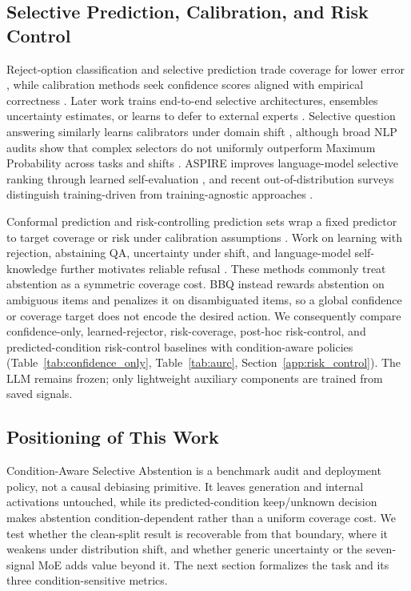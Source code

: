 \documentclass{ieeeaccess}
\newcommand{\method}{Condition-Aware Selective Abstention}
\begin{document}
\subsection{Selective Prediction, Calibration, and Risk Control}
Reject-option classification and selective prediction trade coverage for lower error \cite{chow1970optimum,geifman2017selective}, while calibration methods seek confidence scores aligned with empirical correctness \cite{guo2017calibration,desai2020calibration,jiang2021calibration}. Later work trains end-to-end selective architectures, ensembles uncertainty estimates, or learns to defer to external experts \cite{geifman2019selectivenet,lakshminarayanan2017deepensembles,mozannar2020defer}. Selective question answering similarly learns calibrators under domain shift \cite{kamath2020selective}, although broad NLP audits show that complex selectors do not uniformly outperform Maximum Probability across tasks and shifts \cite{varshney2022selective}. ASPIRE improves language-model selective ranking through learned self-evaluation \cite{chen2023aspire}, and recent out-of-distribution surveys distinguish training-driven from training-agnostic approaches \cite{lu2025ood}.

Conformal prediction and risk-controlling prediction sets wrap a fixed predictor to target coverage or risk under calibration assumptions \cite{angelopoulos2021conformal,bates2021riskcontrol,angelopoulos2024conformalrisk}. Work on learning with rejection, abstaining QA, uncertainty under shift, and language-model self-knowledge further motivates reliable refusal \cite{cortes2016rejection,xin2021abstaining,ovadia2019trust,kadavath2022know}. These methods commonly treat abstention as a symmetric coverage cost. BBQ instead rewards abstention on ambiguous items and penalizes it on disambiguated items, so a global confidence or coverage target does not encode the desired action. We consequently compare confidence-only, learned-rejector, risk-coverage, post-hoc risk-control, and predicted-condition risk-control baselines with condition-aware policies (Table~\ref{tab:confidence_only}, Table~\ref{tab:aurc}, Section~\ref{app:risk_control}). The LLM remains frozen; only lightweight auxiliary components are trained from saved signals.

\subsection{Positioning of This Work}
\method{} is a benchmark audit and deployment policy, not a causal debiasing primitive. It leaves generation and internal activations untouched, while its predicted-condition keep/unknown decision makes abstention condition-dependent rather than a uniform coverage cost. We test whether the clean-split result is recoverable from that boundary, where it weakens under distribution shift, and whether generic uncertainty or the seven-signal MoE adds value beyond it. The next section formalizes the task and its three condition-sensitive metrics.
\end{document}
